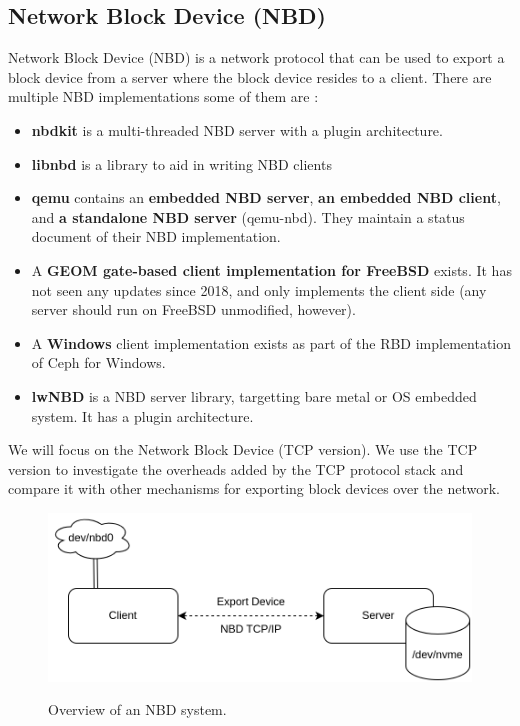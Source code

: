 \subsection{Network Block Device (NBD)}
 Network Block Device (NBD) is a network protocol that can be used to export a block device from a server where the block device resides to a client. There are multiple NBD implementations
 some of them are :
 \begin{itemize}
 \item  \textbf{nbdkit} is a multi-threaded NBD server with a plugin architecture.
 \item  \textbf{libnbd} is a library to aid in writing NBD clients
 \item  \textbf{qemu} contains an \textbf{embedded NBD server}, \textbf{an embedded NBD client}, and \textbf{a standalone NBD server} (qemu-nbd). They maintain a status document of their NBD implementation.
 \item  A \textbf{GEOM gate-based client implementation for FreeBSD} exists. It has not seen any updates since 2018, and only implements the client side (any server should run on FreeBSD unmodified, however).
 \item  A \textbf{Windows} client implementation exists as part of the RBD implementation of Ceph for Windows.
 \item  \textbf{lwNBD} is a NBD server library, targetting bare metal or OS embedded system. It has a plugin architecture.
 \end{itemize}
 We will focus on the Network Block Device (TCP version). We use the TCP version to investigate the overheads added by the TCP protocol stack and compare it with other mechanisms for exporting block devices over the network.
  \begin{figure}[h]
    \includegraphics[scale=0.3]{figures/nbd-path.png}\\
    \caption{Overview of an NBD system.}
  \end{figure}
  
